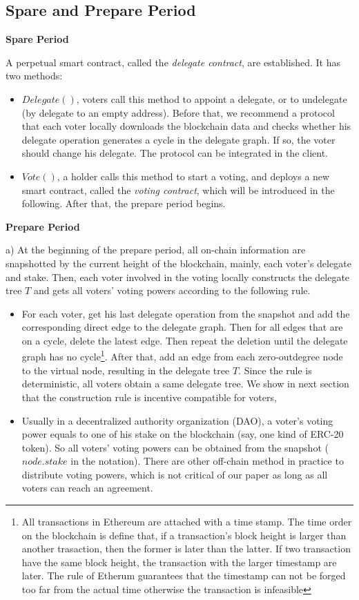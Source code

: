 \subsection{Spare and Prepare Period}
\label{sec:step1}
\textbf{Spare Period}

A perpetual smart contract, called the {\em delegate contract}, are established. It has two methods:
\begin{itemize}
	\item $Delegate()$, voters call this method to appoint a delegate, or to undelegate (by delegate to an empty address). Before that, we recommend a protocol that each voter locally downloads the blockchain data and checks whether his delegate operation generates a cycle in the delegate graph. If so, the voter should change his delegate. The protocol can be integrated in the client. 
	\item $Vote()$, a holder calls this method to start a voting, and deploys a new smart contract, called the {\em voting contract}, which will be introduced in the following. After that, the prepare period begins. 
\end{itemize}

\textbf{Prepare Period}

a) At the beginning of the prepare period, all on-chain information are snapshotted by the current height of the blockchain, mainly, each voter's delegate and stake. Then, each voter involved in the voting locally constructs the delegate tree $T$ and gets all voters' voting powers according to the following rule. 
\begin{itemize}
	\item For each voter, get his last delegate operation from the snapshot and add the corresponding direct edge to the delegate graph. Then for all edges that are on a cycle, delete the latest edge. Then repeat the deletion until the delegate graph has no cycle\footnote{All transactions in Ethereum are attached with a time stamp. The time order on the blockchain is define that, if a transaction's block height is larger than another trasaction, then the former is later than the latter. If two transaction have the same block height, the transaction with the larger timestamp are later. The rule of Etherum guarantees that the timestamp can not be forged too far from the actual time otherwise the transaction is infeasible}. After that, add an edge from each zero-outdegree node to the virtual node, resulting in the delegate tree $T$. Since the rule is deterministic, all voters obtain a same delegate tree. 
	We show in next section  that the construction rule is incentive compatible for voters, 
	\item  Usually in a decentralized authority organization (DAO), a voter's voting power equals to one of his stake on the blockchain (say, one kind of ERC-20 token). So all voters' voting powers can be obtained from the snapshot ($node.stake$ in the notation). There are other off-chain method in practice to distribute voting powers, which is not critical of our paper as long as all voters can reach an agreement.
\end{itemize}

